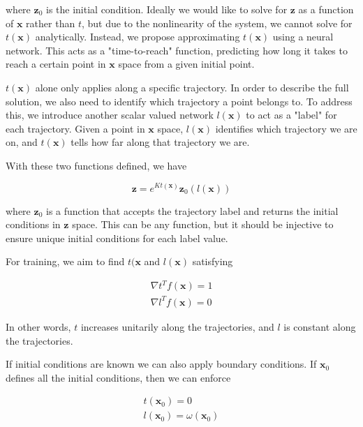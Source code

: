 \documentclass[12pt, letterpaper]{article}
\begin{document}
where $\mathbf{z}_0$ is the initial condition.  Ideally we would like to solve for $\mathbf{z}$ as a function of $\mathbf{x}$ rather than $t$, but due to the nonlinearity of the system, we cannot solve for $t(\mathbf{x})$ analytically.  Instead, we propose approximating $t(\mathbf{x})$ using a neural network.  This acts as a "time-to-reach" function, predicting how long it takes to reach a certain point in $\mathbf{x}$ space from a given initial point.

$t(\mathbf{x})$ alone only applies along a specific trajectory.  In order to describe the full solution, we also need to identify which trajectory a point belongs to.  To address this, we introduce another scalar valued network $l(\mathbf{x})$ to act as a "label" for each trajectory.  Given a point in $\mathbf{x}$ space, $l(\mathbf{x})$ identifies which trajectory we are on, and $t(\mathbf{x})$ tells how far along that trajectory we are.

With these two functions defined, we have

\begin{equation}
    \mathbf{z} = e^{Kt(\mathbf{x})}\mathbf{z}_0(l(\mathbf{x}))
\end{equation}

where $\mathbf{z}_0$ is a function that accepts the trajectory label and returns the initial conditions in $\mathbf{z}$ space.  This can be any function, but it should be injective to ensure unique initial conditions for each label value.

For training, we aim to find $t(\mathbf{x}$ and $l(\mathbf{x})$ satisfying

\begin{equation}
    \begin{matrix}
        \nabla t^T f(\mathbf{x}) = 1 \\
        \nabla l^T f(\mathbf{x}) = 0
    \end{matrix}
\end{equation}

In other words, $t$ increases unitarily along the trajectories, and $l$ is constant along the trajectories.  

If initial conditions are known we can also apply boundary conditions.  If $\mathbf{x}_0$ defines all the initial conditions, then we can enforce

\begin{equation}
    \begin{matrix}
        t(\mathbf{x}_0) = 0 \\
        l(\mathbf{x}_0) = \omega(\mathbf{x}_0)
    \end{matrix}
\end{equation}
\end{document}
